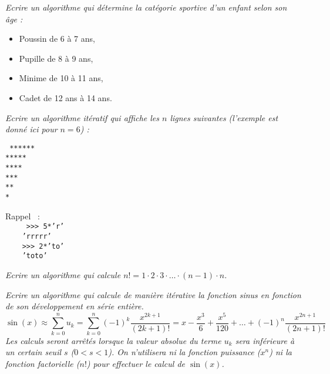 \begin{td}\label{td:categorie}
\em
Ecrire un algorithme qui détermine la catégorie sportive d'un enfant selon
son âge : 
	\begin{itemize}
	\item Poussin de 6 à 7 ans,
	\item Pupille de 8 à 9 ans,
	\item Minime de 10 à 11 ans,
	\item Cadet de 12 ans à 14 ans.
	\end{itemize}
\end{td}

\begin{td}\label{td:etoile}
\em
Ecrire un algorithme itératif qui affiche les $n$ lignes suivantes (l'exemple
est donné ici pour $n=6$) : \\
\begin{minipage}[t]{2cm}\tt
******\\
*****\\
****\\
***\\
**\\
*
\end{minipage}
\hfill
\begin{minipage}[t]{3cm}
Rappel \python\ : \\
{\tt
\mbox{}\ \ \ \ >>> 5*'r'\\
\mbox{}\ \ \ \ 'rrrrr'\\
\mbox{}\ \ \ \ >>> 2*'to'\\
\mbox{}\ \ \ \ 'toto'
}
\end{minipage}
\end{td}

\begin{td}\label{td:factorielle}
\em
Ecrire un algorithme qui calcule $n! = 1\cdot 2\cdot 3\cdot \ldots \cdot (n-1)\cdot n$.
\end{td}

\begin{td}\label{td:sinus}
\em
Ecrire un algorithme qui calcule de manière itérative la fonction sinus
en fonction de son d\'eveloppement en série entière.\\
$$\displaystyle\sin(x) \approx \sum_{k=0}^{n} u_k = \sum_{k=0}^{n} (-1)^k\frac{x^{2k+1}}{(2k+1)!} = x - \frac{x^3}{6} + \frac{x^5}{120} + \ldots + (-1)^n\frac{x^{2n+1}}{(2n+1)!}$$
Les calculs seront arr\^et\'es lorsque la valeur absolue du terme $u_k$ sera 
inf\'erieure \`a un certain seuil $s$ ($0 < s < 1$). On n'utilisera ni la fonction 
{\em puissance} ($x^n$) ni la fonction {\em facto\-riel\-le} ($n!$) pour effectuer
le calcul de $\sin(x)$.
\end{td}

